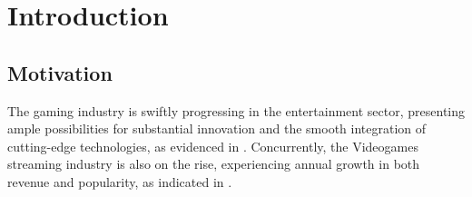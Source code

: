 
%

\chapter{Introduction}
\label{cha:introduction}


\epigraphfontsize{\small\itshape}
\setlength\epigraphwidth{12.5cm}
\setlength\epigraphrule{0pt}




\section{Motivation}
The gaming industry is swiftly progressing in the entertainment sector, presenting ample possibilities for substantial innovation and the smooth integration of cutting-edge technologies, as evidenced in \cite{VideogamesDataSurvey}. Concurrently, the Videogames streaming industry is also on the rise, experiencing annual growth in both revenue and popularity, as indicated in \cite{TwitchRevenue2023}.


